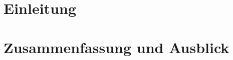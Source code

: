 \chapter{Einleitung}\label{kap:einleitung}

\chapter{Zusammenfassung und Ausblick}\label{kap:zusammenfassung_und_ausblick}
